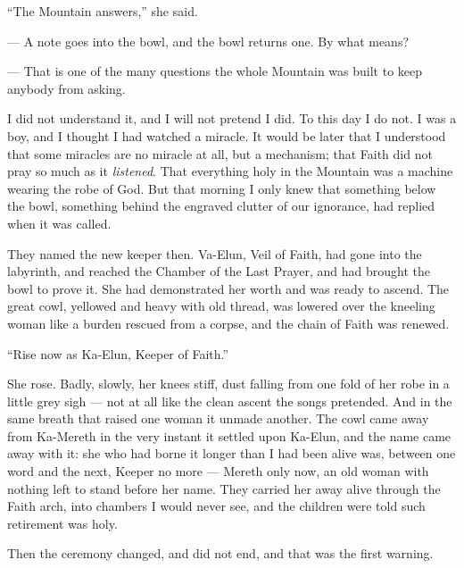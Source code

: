 ``The Mountain answers,'' she said.\par

\begin{room}

--- A note goes into the bowl, and the bowl returns one. By what means?

--- That is one of the many questions the whole Mountain was built to keep anybody from asking.

\end{room}

I did not understand it, and I will not pretend I did. To this day I do not.
I was a boy, and I thought I had watched a miracle. 
It would be later that I understood that some miracles are no miracle at all, but a mechanism; 
that Faith did not pray so much as it \textit{listened}. 
That everything holy in the Mountain was a machine wearing the robe of God. 
But that morning I only knew that something below the bowl, something behind the engraved clutter of our ignorance, had replied when it was called.\par

They named the new keeper then. 
Va-Elun, Veil of Faith, had gone into the labyrinth, and reached the Chamber of the Last Prayer, and had brought the bowl to prove it. 
She had demonstrated her worth and was ready to ascend.
The great cowl, yellowed and heavy with old thread, was lowered over the kneeling woman like a burden rescued from a corpse, 
and the chain of Faith was renewed.\par

``Rise now as Ka-Elun, Keeper of Faith.''\par

She rose. 
Badly, slowly, her knees stiff, dust falling from one fold of her robe in a little grey sigh --- not at all like the clean ascent the songs pretended. 
And in the same breath that raised one woman it unmade another.
The cowl came away from Ka-Mereth in the very instant it settled upon Ka-Elun, and the name came away with it: 
she who had borne it longer than I had been alive was, between one word and the next, 
Keeper no more --- Mereth only now, an old woman with nothing left to stand before her name.
They carried her away alive through the Faith arch, into chambers I would never see, and the children were told such retirement was holy.\par

\ornament

Then the ceremony changed, and did not end, and that was the first warning.\par

